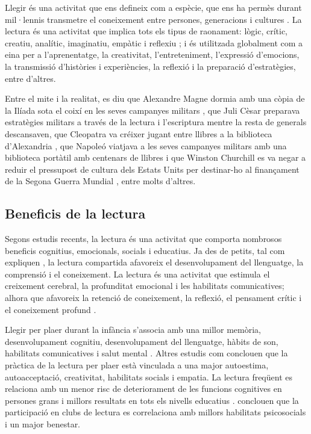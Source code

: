 \documentclass[12pt]{article}
\begin{document}
Llegir és una activitat que ens defineix com a espècie, que ens ha permès durant mil·lennis transmetre el coneixement entre persones, generacions i cultures \parencite{shutaleva}. La lectura és una activitat que implica tots els tipus de raonament: lògic, crític, creatiu, analític, imaginatiu, empàtic i reflexiu \parencite{chiweta_sm}; i és utilitzada globalment com a eina per a l'aprenentatge, la creativitat, l'entreteniment, l'expressió d'emocions, la transmissió d'històries i experiències, la reflexió i la preparació d'estratègies, entre d'altres.

Entre el mite i la realitat, es diu que Alexandre Magne dormia amb una còpia de la Ilíada sota el coixí en les seves campanyes militars \parencite{plutarc}, que Juli Cèsar preparava estratègies militars a través de la lectura i l'escriptura mentre la resta de generals descansaven, que Cleopatra va créixer jugant entre llibres a la biblioteca d'Alexandria \parencite{posteguillo_maldita}, que Napoleó viatjava a les seves campanyes militars amb una biblioteca portàtil amb centenars de llibres i que Winston Churchill es va negar a reduir el pressupost de cultura dels Estats Units per destinar-ho al finançament de la Segona Guerra Mundial \parencite{posteguillo_tertulia}, entre molts d'altres.

\subsection{Beneficis de la lectura}

Segons estudis recents, la lectura és una activitat que comporta nombrosos beneficis cognitius, emocionals, socials i educatius. Ja des de petits, tal com expliquen \textcite{goikoetxea_lectura}, la lectura compartida afavoreix el desenvolupament del llenguatge, la comprensió i el coneixement. La lectura és una activitat que estimula el creixement cerebral, la profunditat emocional i les habilitats comunicatives; alhora que afavoreix la retenció de coneixement, la reflexió, el pensament crític i el coneixement profund \parencite{ataniyazova}. 

Llegir per plaer durant la infància s'associa amb una millor memòria, desenvolupament cognitiu, desenvolupament del llenguatge, hàbits de son, habilitats comunicatives i salut mental \parencite{sun_childhood}. Altres estudis com \textcite{billington_reading} conclouen que la pràctica de la lectura per plaer està vinculada a una major autoestima, autoacceptació, creativitat, habilitats socials i empatia. La lectura freqüent es relaciona amb un menor risc de deteriorament de les funcions cognitives en persones grans i millors resultats en tots els nivells educatius \parencite{chang_reading}. \textcite{banas_biblio} conclouen que la participació en clubs de lectura es correlaciona amb millors habilitats psicosocials i un major benestar.
\end{document}
